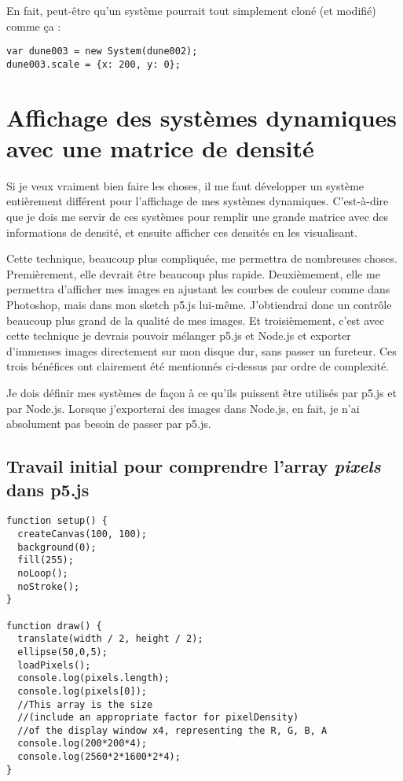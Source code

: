 En fait, peut-être qu'un système pourrait tout simplement cloné (et modifié) comme ça :
\begin{lstlisting}
var dune003 = new System(dune002);
dune003.scale = {x: 200, y: 0};
\end{lstlisting}

\newpage
\section{Affichage des systèmes dynamiques avec une matrice de densité}
Si je veux vraiment bien faire les choses, il me faut développer un système entièrement différent pour l'affichage de mes systèmes dynamiques. C'est-à-dire que je dois me servir de ces systèmes pour remplir une grande matrice avec des informations de densité, et ensuite afficher ces densités en les visualisant. 

Cette technique, beaucoup plus compliquée, me permettra de nombreuses choses. Premièrement, elle devrait être beaucoup plus rapide. Deuxièmement, elle me permettra d'afficher mes images en ajustant les courbes de couleur comme dans Photoshop, mais dans mon sketch p5.js lui-même. J'obtiendrai donc un contrôle beaucoup plus grand de la qualité de mes images. Et troisièmement, c'est avec cette technique je devrais pouvoir mélanger p5.js et Node.js et exporter d'immenses images directement sur mon disque dur, sans passer un fureteur. Ces trois bénéfices ont clairement été mentionnés ci-dessus par ordre de complexité.

Je dois définir mes systèmes de façon à ce qu'ils puissent être utilisés par p5.js et par Node.js. Lorsque j'exporterai des images dans Node.js, en fait, je n'ai absolument pas besoin de passer par p5.js.

\subsection{Travail initial pour comprendre l'array \textit{pixels} dans p5.js}
\begin{lstlisting}
function setup() {
  createCanvas(100, 100);
  background(0);
  fill(255);
  noLoop();
  noStroke();
}

function draw() {
  translate(width / 2, height / 2);
  ellipse(50,0,5);
  loadPixels();
  console.log(pixels.length);
  console.log(pixels[0]);
  //This array is the size 
  //(include an appropriate factor for pixelDensity) 
  //of the display window x4, representing the R, G, B, A
  console.log(200*200*4);
  console.log(2560*2*1600*2*4);
}
\end{lstlisting}

